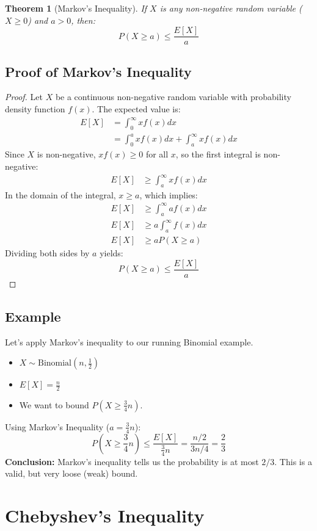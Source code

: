 \documentclass{article}
\newtheorem{theorem}{Theorem}
\begin{document}
\begin{theorem}[Markov's Inequality]
If $X$ is any non-negative random variable ($X \ge 0$) and $a > 0$, then:
\[ P(X \ge a) \le \frac{E[X]}{a} \]
\end{theorem}

\subsection{Proof of Markov's Inequality}
\begin{proof}
Let $X$ be a continuous non-negative random variable with probability density function $f(x)$. The expected value is:
\begin{align*}
E[X] &= \int_{0}^{\infty} x f(x) dx \\
&= \int_{0}^{a} x f(x) dx + \int_{a}^{\infty} x f(x) dx
\end{align*}
Since $X$ is non-negative, $x f(x) \ge 0$ for all $x$, so the first integral is non-negative:
\begin{align*}
E[X] &\ge \int_{a}^{\infty} x f(x) dx
\end{align*}
In the domain of the integral, $x \ge a$, which implies:
\begin{align*}
E[X] &\ge \int_{a}^{\infty} a f(x) dx \\
E[X] &\ge a \int_{a}^{\infty} f(x) dx \\
E[X] &\ge a P(X \ge a)
\end{align*}
Dividing both sides by $a$ yields:
\[ P(X \ge a) \le \frac{E[X]}{a} \]
\end{proof}

\subsection{Example}
Let's apply Markov's inequality to our running Binomial example.
\begin{itemize}
    \item $X \sim \text{Binomial}(n, \frac{1}{2})$
    \item $E[X] = \frac{n}{2}$
    \item We want to bound $P(X \ge \frac{3}{4}n)$.
\end{itemize}
Using Markov's Inequality ($a = \frac{3}{4}n$):
\[ P\left(X \ge \frac{3}{4}n\right) \le \frac{E[X]}{\frac{3}{4}n} = \frac{n/2}{3n/4} = \frac{2}{3} \]
\textbf{Conclusion:} Markov's inequality tells us the probability is at most $2/3$. This is a valid, but very loose (weak) bound.

\section{Chebyshev's Inequality}
\end{document}
